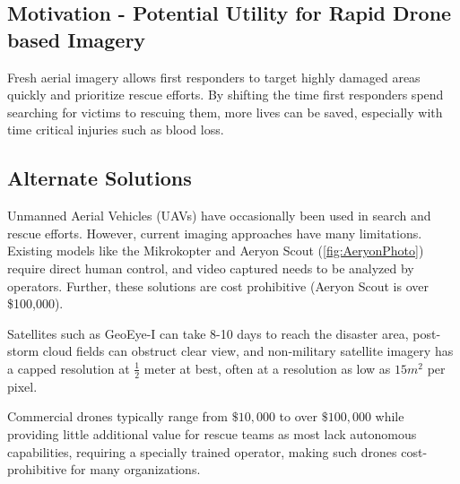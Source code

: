

\subsection{Motivation - Potential Utility for Rapid Drone based Imagery}
Fresh aerial imagery allows first responders to target highly damaged areas quickly and prioritize rescue efforts. By shifting the time first responders spend searching for victims to rescuing them, more lives can be saved, especially with time critical injuries such as blood loss.



\subsection{Alternate Solutions}
Unmanned Aerial Vehicles (UAVs) have occasionally been used in search and rescue efforts. However, current imaging approaches have many limitations. Existing models like the Mikrokopter and Aeryon Scout (\autoref{fig:AeryonPhoto}) require direct human control, and video captured needs to be analyzed by operators. Further, these solutions are cost prohibitive (Aeryon Scout is over \$100,000). \cite{aeryonscout:price}


Satellites such as GeoEye-I can take 8-10 days to reach the disaster area, post-storm cloud fields can obstruct clear view, and non-military satellite imagery has a capped resolution at $\frac{1}{2}$ meter at best, often at a resolution as low as $15m^2$ per pixel. \cite{Shankland:GeoEyeImagery}

Commercial drones typically range from $\$10,000$ to over $\$100,000$ while providing little additional value for rescue teams as most lack autonomous capabilities, requiring a specially trained operator, making such drones cost-prohibitive for many organizations.
\cite{Campoy:CommercialDronesExpensive}

